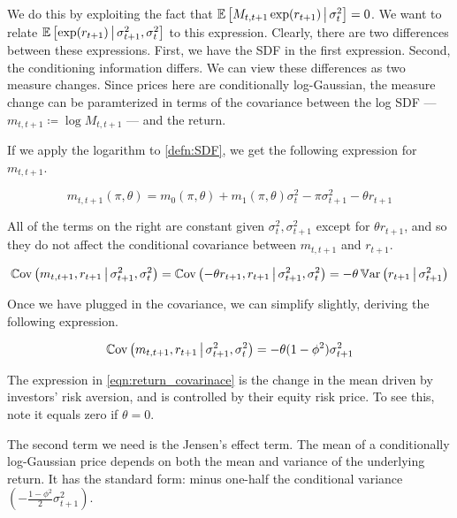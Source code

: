 \documentclass[11pt, letterpaper, twoside, final]{article}
\begin{document}
We do this by exploiting the fact that $\operatorname{\mathbb{E}}\left[M_{t,t+1} \exp(r_{t+1}) \,\middle\vert\, \sigma^2_t \right] = 0$.
We want to relate $\operatorname{\mathbb{E}}\left[\exp(r_{t+1}) \,\middle\vert\, \sigma^2_{t+1}, \sigma^2_t \right]$  to this expression.
Clearly, there are two differences between these expressions.
First, we have the SDF in the first expression.
Second, the conditioning information differs.
We can view these differences as two measure changes.
Since prices here are conditionally log-Gaussian, the measure change  can be paramterized in terms of the
covariance between the log SDF --- $m_{t,t+1} \coloneqq \log M_{t,t+1}$ --- and the return.

If we apply the logarithm to \cref{defn:SDF}, we get the following expression for $m_{t,t+1}$.

\begin{equation}
    \label{eqn:log_sdf}
        m_{t,t+1}(\pi, \theta) = m_{0}(\pi, \theta) + m_1(\pi, \theta) \sigma_t^2 - \pi \sigma^2_{t+1} - \theta
        r_{t+1}
\end{equation}

All of the terms on the right are constant given $\sigma^2_t, \sigma^2_{t+1}$ except for $\theta r_{t+1}$, and so
they do not affect the conditional covariance between $m_{t,t+1}$ and $r_{t+1}$.

\begin{equation}
    \Cov\left(m_{t,t+1}, r_{t+1} \mvert \sigma^2_{t+1}, \sigma^2_t \right)   
%
    = \Cov\left(-\theta r_{t+1}, r_{t+1} \mvert \sigma^2_{t+1}, \sigma^2_t \right)   
%
    = -\theta \Var\left(r_{t+1} \mvert \sigma^2_{t+1}\right)   
\end{equation}

Once we have plugged in the covariance, we can simplify slightly, deriving the following expression.

\begin{equation}
    \label{eqn:return_covarinace}
    \Cov\left(m_{t,t+1}, r_{t+1} \mvert \sigma^2_{t+1}, \sigma^2_t \right)   
%
    = -\theta (1 - \phi^2) \sigma^2_{t+1} 
\end{equation}

The expression in \cref{eqn:return_covarinace} is the change in the mean driven by investors' risk aversion, and
is controlled by their equity risk price.
To see this, note it equals zero if $\theta = 0$.

The second term we need is the Jensen's effect term.
The mean of a conditionally log-Gaussian price depends on both the mean and variance of the underlying return.
It has the standard form: minus one-half the conditional variance $\left(-\frac{1 - \phi^2}{2}
\sigma^2_{t+1}\right)$. 
\end{document}
